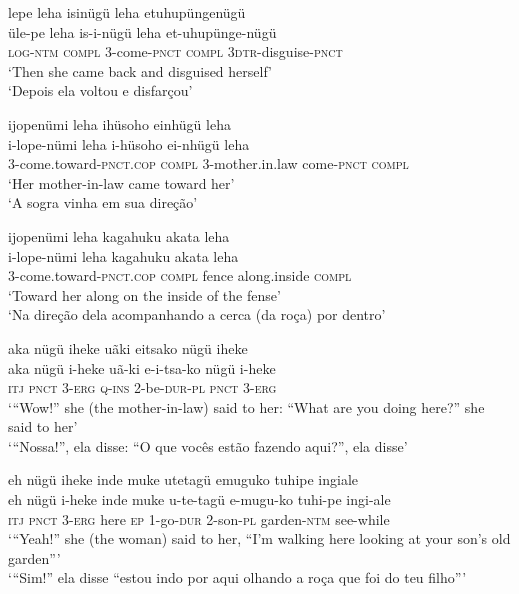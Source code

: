\documentclass[output=paper,
modfonts,nonflat
]{langsci/langscibook}
\begin{document}
\ea lepe leha isinügü leha etuhupüngenügü\\[.3em]
\gll üle-pe		leha	is-i-nügü	leha	et-uhupünge-nügü\\
\textsc{log}-\textsc{ntm}	\textsc{compl}	3-come-\textsc{pnct} 	\textsc{compl}	3\textsc{dtr}-disguise-\textsc{pnct} \\
\glt ‘Then she came back and disguised herself’\\
‘Depois ela voltou e disfarçou’\\
\z

\ea ijopenümi leha ihüsoho einhügü leha\\[.3em]
\gll i-lope-nümi leha	i-hüsoho	ei-nhügü	leha\\
3-come.toward-\textsc{pnct.cop}	\textsc{compl}	3-mother.in.law 	come-\textsc{pnct}	\textsc{compl} \\
\glt ‘Her mother-in-law came toward her’\\
‘A sogra vinha em sua direção’\\
\z

\ea ijopenümi leha kagahuku akata leha\\[.3em]
\gll i-lope-nümi	leha		kagahuku	akata		leha\\
3-come.toward-\textsc{pnct.cop}	\textsc{compl}	fence 	along.inside 	\textsc{compl} \\
\glt ‘Toward her along on the inside of the fense’\\
‘Na direção dela acompanhando a cerca (da roça) por dentro’\\
\z

\ea aka nügü iheke uãki eitsako nügü iheke\\[.3em]
\gll aka	nügü	i-heke	uã-ki	e-i-tsa-ko	nügü	i-heke\\
\textsc{itj}	\textsc{pnct}	3-\textsc{erg}	\textsc{q-ins}	2-be-\textsc{dur-pl} 	\textsc{pnct}	3-\textsc{erg} \\
\glt ‘“Wow!” she (the mother-in-law) said to her: “What are you doing here?” she said to her’\\
‘“Nossa!”, ela disse: “O que vocês estão fazendo aqui?”, ela disse’\\
\z

\ea eh nügü iheke inde muke utetagü emuguko tuhipe ingiale\\[.3em]
\gll eh	nügü	i-heke	inde	muke	u-te-tagü	e-mugu-ko	tuhi-pe	ingi-ale\\
\textsc{itj}	\textsc{pnct}	3-\textsc{erg}   here	\textsc{ep}	1-go-\textsc{dur} 	2-son-\textsc{pl} 	garden-\textsc{ntm} 	see-while\\
\glt ‘“Yeah!” she (the woman) said to her, “I'm walking here looking at your son’s old garden”’\\
‘“Sim!” ela disse “estou indo por aqui olhando a roça que foi do teu filho”’\\
\z
\end{document}
